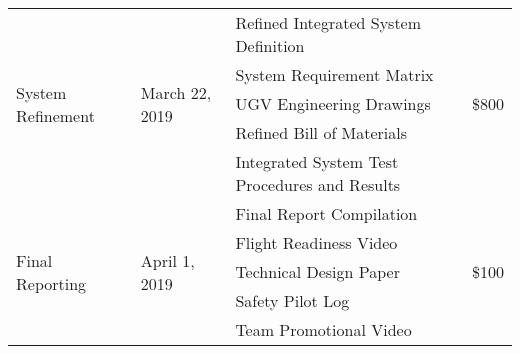 \begin{center}
\begin{tabular}{|p{4cm}|p{3.5cm}|p{7cm}|p{1.5cm}|}
\multirow{5}{4cm}{System Refinement} & \multirow{5}{3.5cm}{March 22, 2019} & Refined Integrated System Definition & \multirow{5}{1.5cm}{ \$800}\\
	&	& System Requirement Matrix&	\\
	&	& UGV Engineering Drawings&	\\
	&	& Refined Bill of Materials&	\\
	&	& Integrated System Test Procedures and Results &	\\ \hline	

\multirow{5}{4cm}{Final Reporting} & \multirow{5}{4cm}{April 1, 2019} & Final Report Compilation& \multirow{5}{4cm}{\$100}\\
	&	& Flight Readiness Video&	\\
	&	&Technical Design Paper&	\\
	&	&Safety Pilot Log&	\\
	&	&Team Promotional Video& \\ \hline	

  \hline  
\end{tabular}

\end{center}
